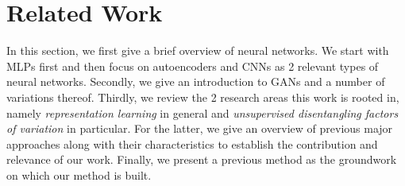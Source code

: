\documentclass[12pt,a4paper]{article}
\begin{document}
\newpage
\section{Related Work}\label{sec:related_work}
In this section, we first give a brief overview of neural networks. We start with MLPs first and then focus on autoencoders and CNNs as 2 relevant types of neural networks. Secondly, we give an introduction to GANs and a number of variations thereof. Thirdly, we review the 2 research areas this work is rooted in, namely \textit{representation learning} in general and \textit{unsupervised disentangling factors of variation} in particular. For the latter, we give an overview of previous major approaches along with their characteristics to establish the contribution and relevance of our work. Finally, we present a previous method as the groundwork on which our method is built.
\end{document}
